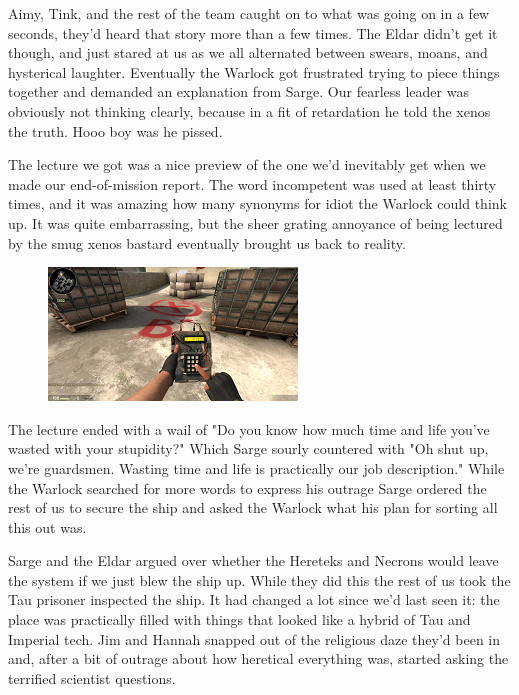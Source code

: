 Aimy, Tink, and the rest of the team caught on to what was going on in a few seconds, they'd heard that story more than a few times. 
The Eldar didn't get it though, and just stared at us as we all alternated between swears, moans, and hysterical laughter. 
Eventually the Warlock got frustrated trying to piece things together and demanded an explanation from Sarge. 
Our fearless leader was obviously not thinking clearly, because in a fit of retardation he told the xenos the truth. 
Hooo boy was he pissed.

The lecture we got was a nice preview of the one we'd inevitably get when we made our end-of-mission report. 
The word incompetent was used at least thirty times, and it was amazing how many synonyms for idiot the Warlock could think up. 
It was quite embarrassing, but the sheer grating annoyance of being lectured by the smug xenos bastard eventually brought us back to reality.

\begin{figure}
	\begin{center}
		\includegraphics[width=\figwidth]{pics/11/83.png}
	\end{center}
\end{figure}
The lecture ended with a wail of "Do you know how much time and life you've wasted with your stupidity?" Which Sarge sourly countered with "Oh shut up, we're guardsmen. 
Wasting time and life is practically our job description." While the Warlock searched for more words to express his outrage Sarge ordered the rest of us to secure the ship and asked the Warlock what his plan for sorting all this out was.

Sarge and the Eldar argued over whether the Hereteks and Necrons would leave the system if we just blew the ship up. 
While they did this the rest of us took the Tau prisoner inspected the ship. 
It had changed a lot since we'd last seen it: 
the place was practically filled with things that looked like a hybrid of Tau and Imperial tech. 
Jim and Hannah snapped out of the religious daze they'd been in and, after a bit of outrage about how heretical everything was, started asking the terrified scientist questions. 



